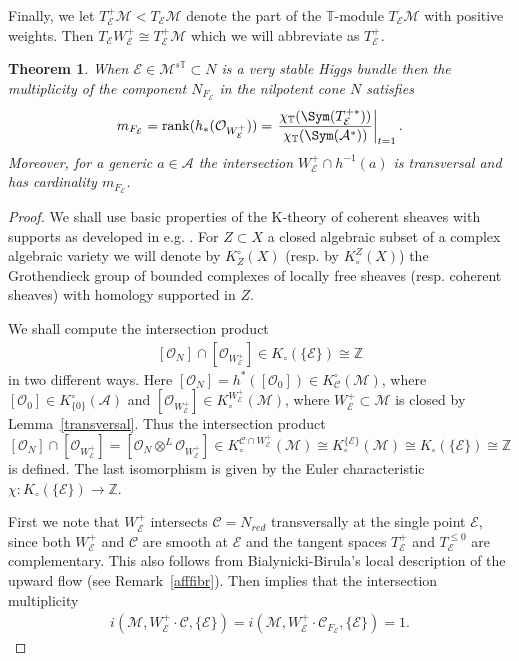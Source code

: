 \documentclass[12pt]{article}
\numberwithin{equation}{section}
\newtheorem{theorem}{Theorem}
\theoremstyle{remark}
\theoremstyle{definition}
\numberwithin{theorem}{section}
\def\beq{\begin{eqnarray}}
\def\eeq{\end{eqnarray}}
\def\calE{{\mathcal E}}
\DeclareMathOperator{\rank}{rank}
\def\M{{\mathcal{M}}}
\def\calA{{\mathcal{A}}}
\newcommand{\T}{{\mathbb{T}}}
\def\calC{{\mathcal C}}
\def\calO{{\mathcal O}}
\def\Z{\mathbb{Z}}
\renewcommand{\1}{\mathbbm{1}}
\begin{document}
Finally, we let $T_\calE^+\M<T_\calE\M$ denote the part of the $\T$-module $T_\calE\M$ with positive weights. Then $T_\calE W^+_\calE\cong T_\calE^+\M$ which  we will abbreviate as $T_\calE^+$.
\begin{theorem} \label{multiplicity} When $\calE\in \M^{s \T}\subset N$ is a very stable Higgs bundle then the multiplicity of the component $N_{F_\calE}$   in the nilpotent cone $N$ satisfies $$m_{F_\calE}=\rank(h_*(\calO_{W^+_\calE}))=\left. { \chi_\T(\Sym(T^{+*}_\calE))\over \chi_\T(\Sym(\calA^*))}\right|_{t=1}.$$  Moreover, for a generic $a\in \calA$  the intersection $W^+_\calE\cap h^{-1}(a)$ is transversal and has cardinality $m_{F_\calE}$. 
\end{theorem}
\begin{proof} We shall use basic properties of the 
	K-theory of coherent sheaves with supports as developed in e.g. \cite{baum-etal,gillet-soule, piepmeyer-walker}. For $Z\subset X$ a closed algebraic  subset of a complex algebraic variety we will denote by $K^\circ_Z(X)$ (resp. by $K^Z_\circ(X)$)  the Grothendieck group of bounded complexes of locally free sheaves (resp. coherent sheaves) with homology supported in $Z$.
	
	We shall compute the intersection product \beq \label{rankmult} [\calO_{N}]\cap [\calO_{W^+_\calE}]\in  K_\circ(\{\calE\})\cong \Z\eeq 
	in two different ways. Here $[\calO_{N}]=h^*([\calO_0])\in K^\circ_\calC(\M)$, where  $[\calO_0]\in K^\circ_{\{0\}}(\calA)$
	and $[\calO_{W^+_\calE}]\in K^{W^+_\calE}_\circ(\M)$, where $W^+_\calE\subset \M$ is closed by Lemma~\ref{transversal}.  Thus the intersection product $$[\calO_{N}]\cap[\calO_{W^+_\calE}]=[\calO_N\otimes^L\calO_{W^+_\calE}] \in K_\circ^{\calC\cap W^+_{\calE}}(\M)\cong K^{\{\calE\}}_\circ (\M)\cong K_\circ(\{\calE\})\cong \Z$$ is defined. The last isomorphism is given by the Euler characteristic $\chi:K_\circ(\{ \calE \})\to \Z$.  %
	
	
	First we note that $W^+_\calE$ intersects $\calC=N_{red}$ transversally at the single point $\calE$, since both $W^+_\calE$ and $\calC$ are smooth at $\calE$ and the tangent spaces  $T^+_\calE$ and $T^{\leq  0}_\calE$ are complementary. This also follows from Bialynicki-Birula's local description of the upward flow (see Remark~\ref{afffibr}). Then \cite[\href{https://stacks.math.columbia.edu/tag/0B1I}{Lemma 42.14.3}]{stackproject} implies that the intersection multiplicity \beq\label{tranint}i(\M,W^+_\calE\cdot \calC,\{\calE\})=i(\M,W^+_\calE\cdot \calC_{F_\calE},\{\calE\})=1.\eeq
	

\end{proof}
\end{document}
